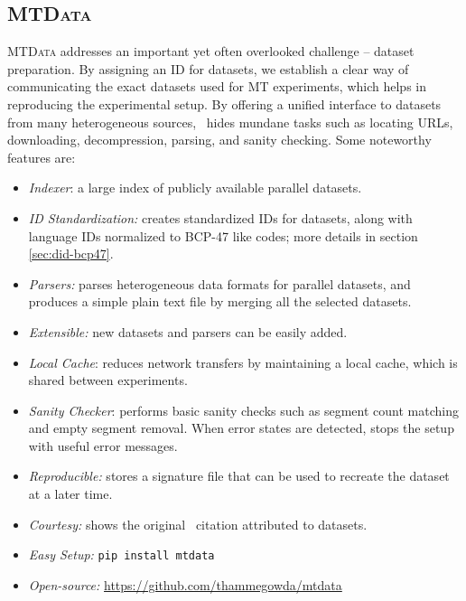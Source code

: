 \subsection{\textsc{MTData}}
\label{sec:mtdata}
\textsc{MTData} addresses an important yet often overlooked challenge -- dataset preparation. 
By assigning an ID for datasets, we establish a clear way of communicating the exact datasets used for MT experiments, which helps in reproducing the experimental setup.
By offering a unified interface to datasets from many heterogeneous sources, \mtdata\ hides mundane tasks such as locating URLs, downloading, decompression, parsing, and sanity checking. Some noteworthy features are:
\begin{itemize}[noitemsep,topsep=0pt,leftmargin=4mm]
\item \textit{Indexer}: a large index of publicly available parallel datasets.
\item \textit{ID Standardization:} creates standardized IDs for datasets, along with language IDs normalized to BCP-47 like codes; more details in section \ref{sec:did-bcp47}. 
\item \textit{Parsers:} parses heterogeneous data formats for parallel datasets, and produces a simple plain text file by merging all the selected datasets.
\item \textit{Extensible:} new datasets and parsers can be easily added.
\item \textit{Local Cache}: reduces network transfers by maintaining a local cache, which is shared between experiments.
\item \textit{Sanity Checker}: performs basic sanity checks such as segment count matching and empty segment removal. When error states are detected, stops the setup with useful error messages.
\item \textit{Reproducible:} stores a signature file that can be used to recreate the dataset at a later time.
\item \textit{Courtesy:} shows the original \BibTeX\ citation attributed to datasets.
\item \textit{Easy Setup:} \texttt{pip install mtdata}
\item \textit{Open-source:} \url{https://github.com/thammegowda/mtdata}
\end{itemize}

